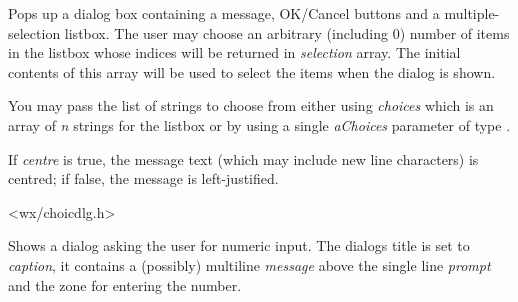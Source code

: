 
Pops up a dialog box containing a message, OK/Cancel buttons and a
multiple-selection listbox. The user may choose an arbitrary (including 0)
number of items in the listbox whose indices will be returned in
{\it selection} array. The initial contents of this array will be used to
select the items when the dialog is shown.

You may pass the list of strings to choose from either using {\it choices}
which is an array of {\it n} strings for the listbox or by using a single
{\it aChoices} parameter of type .

If {\it centre} is true, the message text (which may include new line
characters) is centred; if false, the message is left-justified.


<wx/choicdlg.h>



\label{wxgetnumberfromuser}


Shows a dialog asking the user for numeric input. The dialogs title is set to
{\it caption}, it contains a (possibly) multiline {\it message} above the
single line {\it prompt} and the zone for entering the number.

